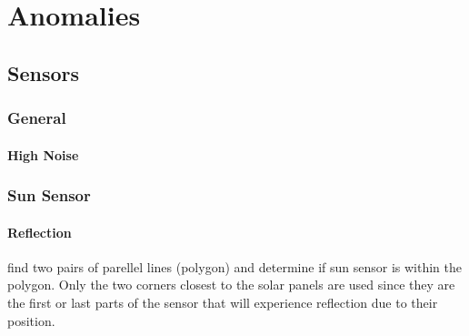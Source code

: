 \chapter{Anomalies}
\vspace{-2em}
\minitoc

\section{Sensors}
\subsection{General}
\subsubsection{High Noise}

\subsection{Sun Sensor}
\subsubsection{Reflection}

find two pairs of parellel lines (polygon) and determine if sun sensor is within the polygon. Only the two corners closest to the solar panels are used since they are the first or last parts of the sensor that will experience reflection due to their position.
